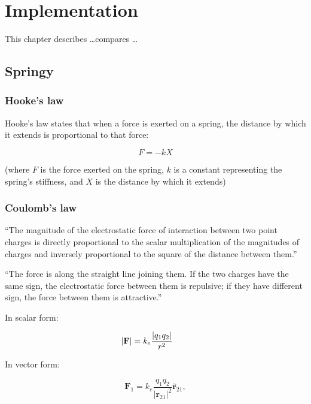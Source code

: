 \chapter{Implementation}

This chapter describes \ldots compares \ldots

\section{Springy}

\subsection{Hooke's law}

Hooke's law states that when a force is exerted on a spring, the distance by which it extends is proportional to that force:

$$
F = -kX
$$

(where $F$ is the force exerted on the spring, $k$ is a constant representing the spring's stiffness, and $X$ is the distance by which it extends)

\subsection{Coulomb's law}

``The magnitude of the electrostatic force of interaction between two point charges is directly proportional to the scalar multiplication of the magnitudes of charges and inversely proportional to the square of the distance between them.''

``The force is along the straight line joining them. If the two charges have the same sign, the electrostatic force between them is repulsive; if they have different sign, the force between them is attractive.'' 

In scalar form:

$$
|\mathbf F|=k_e{|q_1q_2|\over r^2}\qquad
$$

In vector form:

$$
\qquad\mathbf F_1=k_e\frac{q_1q_2}{{|\mathbf r_{21}|}^2} \mathbf{\hat{r}}_{21},\qquad
$$
